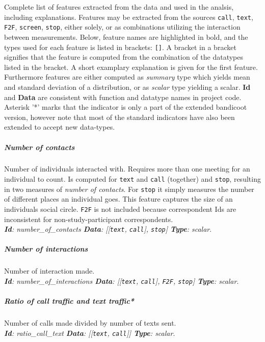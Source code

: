 Complete list of features extracted from the data and used in the analsis, including explanations. Features may be extracted from the sources \texttt{\small call}, \texttt{\small text}, \texttt{\small F2F}, \texttt{\small screen}, \texttt{\small stop}, either solely, or as combinations utilizing the interaction between measurements. Below, feature names are highlighted in bold, and the types used for each feature is listed in brackets: \texttt{\small []}. A bracket in a bracket signifies that the feature is computed from the combination of the datatypes listed in the bracket. A short examplary explanation is given for the first feature. Furthermore features are either computed as \textit{summary} type which yields mean and standard deviation of a distribution, or as \textit{scalar} type yielding a scalar. \textbf{Id} and \textbf{Data} are consistent with function and datatype names in project code. Asterisk '*' marks that the indicator is only a part of the extended bandicoot version, however note that most of the standard indicators have also been extended to accept new data-types.

\subparagraph*{Number of contacts}
Number of individuals interacted with. Requires more than one meeting for an individual to count. Is computed for \texttt{\small text} and \texttt{\small call} (together) and \texttt{\small stop}, resulting in two measures of \textit{number of contacts}. For \texttt{\small stop} it simply measures the number of different places an individual goes. This feature captures the size of an individuals social circle. \texttt{\small F2F} is not included because correspondent Ids are inconsistent for non-study-participant correspondents.\\ \textit{\textbf{Id}: number\_of\_contacts \textbf{Data}: [[\texttt{\footnotesize text}, \texttt{\footnotesize call}], \texttt{\footnotesize stop}] \textbf{Type}: scalar}.

\subparagraph*{Number of interactions}
Number of interaction made. \\ \textit{\textbf{Id}: number\_of\_interactions \textbf{Data}: [[\texttt{\footnotesize text}, \texttt{\footnotesize call}], \texttt{\footnotesize F2F}, \texttt{\footnotesize stop}] \textbf{Type}: scalar}.

\subparagraph*{Ratio of call traffic and text traffic*}
Number of calls made divided by number of texts sent.\\ \textit{\textbf{Id}: ratio\_call\_text \textbf{Data}: [[\texttt{\footnotesize text}, \texttt{\footnotesize call}]] \textbf{Type}: scalar}.


